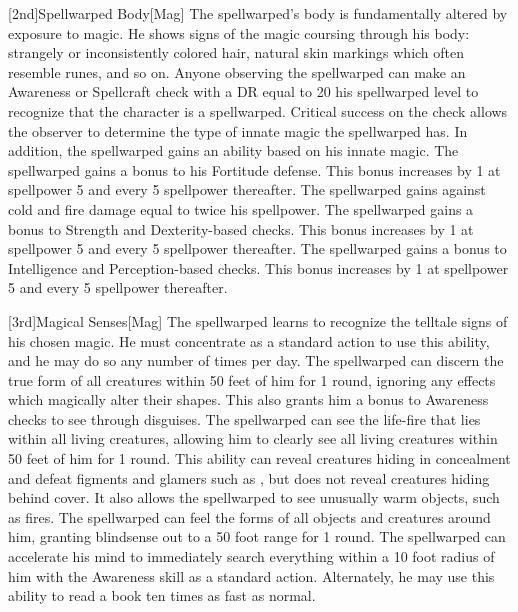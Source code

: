         [2nd]{Spellwarped Body}[Mag]
        The spellwarped's body is fundamentally altered by exposure to magic.
        He shows signs of the magic coursing through his body: strangely or inconsistently colored hair, natural skin markings which often resemble runes, and so on.
        Anyone observing the spellwarped can make an Awareness or Spellcraft check with a DR equal to 20 \sub his spellwarped level to recognize that the character is a spellwarped.
        Critical success on the check allows the observer to determine the type of innate magic the spellwarped has.
        In addition, the spellwarped gains an ability based on his innate magic.
        The spellwarped gains a  bonus to his Fortitude defense.
        This bonus increases by 1 at spellpower 5 and every 5 spellpower thereafter.
        The spellwarped gains  against cold and fire damage equal to twice his spellpower.
        The spellwarped gains a  bonus to Strength and Dexterity-based checks.
        This bonus increases by 1 at spellpower 5 and every 5 spellpower thereafter.
        The spellwarped gains a  bonus to Intelligence and Perception-based checks.
        This bonus increases by 1 at spellpower 5 and every 5 spellpower thereafter.

        [3rd]{Magical Senses}[Mag]
        The spellwarped learns to recognize the telltale signs of his chosen magic.
        He must concentrate as a standard action to use this ability, and he may do so any number of times per day.
        The spellwarped can discern the true form of all creatures within 50 feet of him for 1 round, ignoring any effects which magically alter their shapes.
        This also grants him a  bonus to Awareness checks to see through disguises.
        The spellwarped can see the life-fire that lies within all living creatures, allowing him to clearly see all living creatures within 50 feet of him for 1 round.
        This ability can reveal creatures hiding in concealment and defeat figments and glamers such as , but does not reveal creatures hiding behind cover.
        It also allows the spellwarped to see unusually warm objects, such as fires.
        The spellwarped can feel the forms of all objects and creatures around him, granting blindsense out to a 50 foot range for 1 round.
        The spellwarped can accelerate his mind to immediately search everything within a 10 foot radius of him with the Awareness skill as a standard action.
        Alternately, he may use this ability to read a book ten times as fast as normal.

